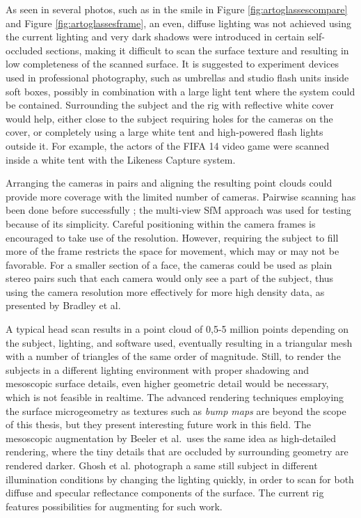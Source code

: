 As seen in several photos, such as in the smile in Figure \ref{fig:artoglassescompare} and Figure \ref{fig:artoglassesframe}, an even, diffuse lighting was not achieved using the current lighting and very dark shadows were introduced in certain self-occluded sections, making it difficult to scan the surface texture and resulting in low completeness of the scanned surface.
It is suggested to experiment devices used in professional photography, such as umbrellas and studio flash units inside soft boxes, possibly in combination with a large light tent where the system could be contained.
Surrounding the subject and the rig with reflective white cover would help, either close to the subject requiring holes for the cameras on the cover, or completely using a large white tent and high-powered flash lights outside it.
For example, the actors of the FIFA 14 video game were scanned inside a white tent with the Likeness Capture system. \cite{eafifa14,capturelab}

Arranging the cameras in pairs and aligning the resulting point clouds could provide more coverage with the limited number of cameras.
Pairwise scanning has been done before successfully \cite{eafifa14,beeler2010high,bradley2010high};
the multi-view SfM approach was used for testing because of its simplicity.
Careful positioning within the camera frames is encouraged to take use of the resolution.
However, requiring the subject to fill more of the frame restricts the space for movement, which may or may not be favorable.
For a smaller section of a face, the cameras could be used as plain stereo pairs such that each camera would only see a part of the subject, thus using the camera resolution more effectively for more high density data, as presented by Bradley et al.\ \cite{bradley2010high}


A typical head scan results in a point cloud of 0,5-5 million points depending on the subject, lighting, and software used, eventually resulting in a triangular mesh with a number of triangles of the same order of magnitude.
Still, to render the subjects in a different lighting environment with proper shadowing and mesoscopic surface details, even higher geometric detail would be necessary, which is not feasible in realtime.
The advanced rendering techniques employing the surface microgeometry as textures such as \emph{bump maps} are beyond the scope of this thesis, but they present interesting future work in this field.
The mesoscopic augmentation by Beeler et al.\ uses the same idea as high-detailed rendering, where the tiny details that are occluded by surrounding geometry are rendered darker. \cite{beeler2010high}
Ghosh et al. \cite{ghosh2011multiview} photograph a same still subject in different illumination conditions by changing the lighting quickly, in order to scan for both diffuse and specular reflectance components of the surface.
The current rig features possibilities for augmenting for such work.

